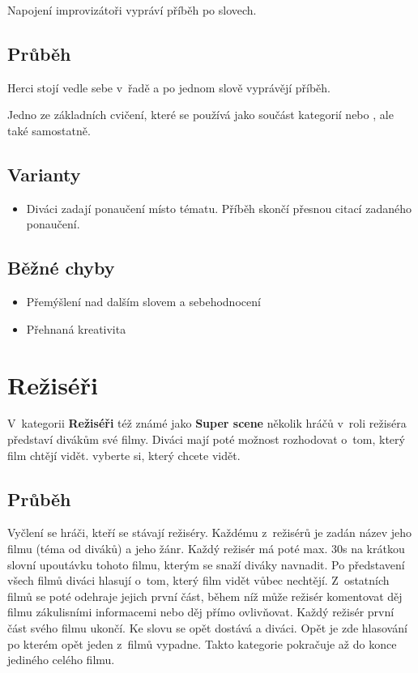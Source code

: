  
Napojení improvizátoři vypráví příběh po slovech. 
 
 
\subsection{ Průběh }  
Herci stojí vedle sebe v~řadě a po jednom slově vyprávějí příběh. 
 
Jedno ze základních cvičení, které se používá jako součást kategorií  nebo , ale také samostatně. 
 
 
\subsection{ Varianty }  
\begin{itemize}
\item  Diváci zadají ponaučení místo tématu. Příběh skončí přesnou citací zadaného ponaučení.
\end{itemize}
 
\subsection{ Běžné chyby }  
\begin{itemize}
\item  Přemýšlení nad dalším slovem a sebehodnocení
\item  Přehnaná kreativita
\end{itemize}
 
 
 
 
 
 
 
\needspace{5cm} \section{Režiséři} \label{režiséři}  
 
V~kategorii \textbf{Režiséři} též známé jako \textbf{Super scene} několik hráčů v~roli režiséra představí divákům své filmy. Diváci mají poté možnost rozhodovat o~tom, který film chtějí vidět. vyberte si, který chcete vidět. 
 
\subsection{Průběh} Vyčlení se hráči, kteří se stávají režiséry. Každému z~režisérů je zadán název jeho filmu (téma od diváků) a jeho žánr. Každý režisér má poté max. 30s na krátkou slovní upoutávku tohoto filmu, kterým se snaží diváky navnadit. Po představení všech filmů diváci hlasují o~tom, který film vidět vůbec nechtějí. Z~ostatních filmů se poté odehraje jejich první část, během níž může režisér komentovat děj filmu zákulisními informacemi nebo děj přímo ovlivňovat. Každý režisér první část svého filmu ukončí. Ke slovu se opět dostává  a diváci. Opět je zde hlasování po kterém opět jeden z~filmů vypadne. Takto kategorie pokračuje až do konce jediného celého filmu. 
 
